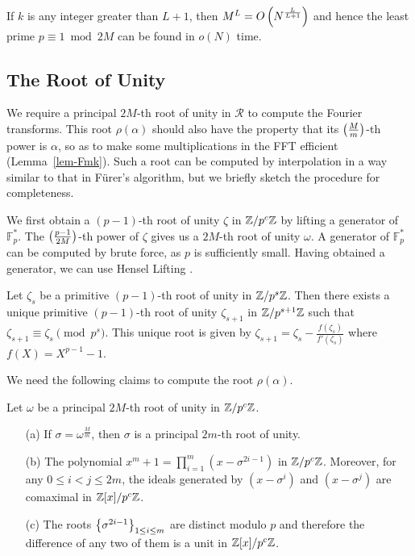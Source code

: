 \documentclass[11pt]{article}
\renewcommand{\R}{\mathcal{R}} %
\begin{document}
\begin{remark}\label{prime_time}
If $k$ is any integer greater than $L+1$, then $M^L =
O\left(N^{\frac{L}{L+1}}\right)$ and hence the least prime $p\equiv
1\bmod{2M}$ can be found in $o(N)$ time.
\end{remark}


\subsection{The Root of Unity}\label{root_section}

We require a principal $2M$-th root of unity in $\R$ to compute the
Fourier transforms. This root $\rho(\alpha)$ should also have the
property that its $\left(\frac{M}{m}\right)$-th power is $\alpha$, so as
to make some multiplications in the FFT efficient
(Lemma~\ref{lem-Fmk}). Such a root can be computed by interpolation in
a way similar to that in F\"{u}rer's algorithm\cite[Section 3]{Furer},
but we briefly sketch the procedure for completeness.


We first obtain a $(p-1)$-th root of unity $\zeta$ in $\mathbb{Z}/p^c\mathbb{Z}$ by
lifting a generator of $\mathbb{F}_p^*$. The
$\left(\frac{p-1}{2M}\right)$-th power of $\zeta$ gives us a $2M$-th root
of unity $\omega$. A generator of $\mathbb{F}_p^*$ can be computed by
brute force, as $p$ is sufficiently small. Having obtained a
generator, we can use Hensel Lifting \cite[Theorem 2.23]{Zuckerman}.

\begin{lemma}
Let $\zeta_s$ be a primitive $(p-1)$-th root of unity in
$\mathbb{Z}/p^s\mathbb{Z}$. Then there exists a unique primitive $(p-1)$-th root of
unity $\zeta_{s+1}$ in $\mathbb{Z}/p^{s+1}\mathbb{Z}$ such that $\zeta_{s+1}\equiv
\zeta_s\pmod{p^s}$. This unique root is given by $\zeta_{s+1} =
\zeta_s - \frac{f(\zeta_s)}{f'(\zeta_s)}$ where $f(X) = X^{p-1} - 1$.
\end{lemma}

We need the following claims to compute the root $\rho(\alpha)$.

\begin{claim}\label{claim_for_rho} Let $\omega$ be a principal $2M$-th
  root of unity in
  $\mathbb{Z}/p^c\mathbb{Z}$.
  \begin{enumerate}
  \item[(a)] If $\sigma = \omega^{\frac{M}{m}}$, then $\sigma$ is a
    principal $2m$-th root of unity.
  \item[(b)] The polynomial $x^m+1 = \prod_{i=1}^{m}(x -
    \sigma^{2i-1})$ in $\mathbb{Z}/p^c\mathbb{Z}$. Moreover, for any $0\leq i<j\leq
    2m$, the ideals generated by $(x - \sigma^i)$ and $(x - \sigma^j)$
    are comaximal in $\mathbb{Z}[x]/p^c\mathbb{Z}$.
  \item[(c)] The roots $\left\{\sigma^{2i-1}\right\}_{1\leq i \leq m}$ are
    distinct modulo $p$ and therefore the difference of any two of
    them is a unit in $\mathbb{Z}[x]/p^c\mathbb{Z}$.
  \end{enumerate}
\end{claim}
\end{document}
